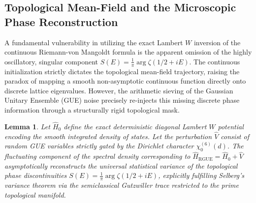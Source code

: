 \documentclass[aps,prl,preprint,superscriptaddress,floatfix]{revtex4-2}
\newtheorem{lemma}[theorem]{Lemma}
\begin{document}
\subsection{Topological Mean-Field and the Microscopic Phase Reconstruction}

A fundamental vulnerability in utilizing the exact Lambert $W$ inversion of the continuous Riemann-von Mangoldt formula is the apparent omission of the highly oscillatory, singular component $S(E) = \frac{1}{\pi} \arg \zeta(1/2+iE)$. The continuous initialization strictly dictates the topological mean-field trajectory, raising the paradox of mapping a smooth non-asymptotic continuous function directly onto discrete lattice eigenvalues. However, the arithmetic sieving of the Gaussian Unitary Ensemble (GUE) noise precisely re-injects this missing discrete phase information through a structurally rigid topological mask.

\begin{lemma}
\label{lemma:phase_absorption_formal_gutzwiller}
Let $\hat{H}_0$ define the exact deterministic diagonal Lambert $W$ potential encoding the smooth integrated density of states. Let the perturbation $\hat{V}$ consist of random GUE variables strictly gated by the Dirichlet character $\chi_0^{(6)}(d)$. The fluctuating component of the spectral density corresponding to $\hat{H}_{\text{RGUE}} = \hat{H}_0 + \hat{V}$ asymptotically reconstructs the universal statistical variance of the topological phase discontinuities $S(E) = \frac{1}{\pi} \arg \zeta(1/2+iE)$, explicitly fulfilling Selberg's variance theorem via the semiclassical Gutzwiller trace restricted to the prime topological manifold.
\end{lemma}
\end{document}

